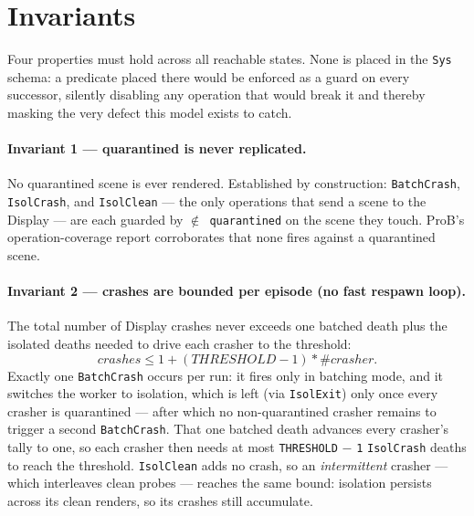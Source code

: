 \documentclass[a4paper,10pt,fleqn]{article}
\begin{document}
\section{Invariants}
\label{sec:inv}

Four properties must hold across all reachable states.  None is placed in the
\texttt{Sys} schema: a predicate placed there would be enforced as a guard on
every successor, silently disabling any operation that would break it and thereby
masking the very defect this model exists to catch.

\paragraph{Invariant 1 --- quarantined is never replicated.}
No quarantined scene is ever rendered.  Established by construction:
\texttt{BatchCrash}, \texttt{IsolCrash}, and \texttt{IsolClean} --- the only
operations that send a scene to the Display --- are each guarded by
\texttt{$\notin$ quarantined} on the scene they touch.  ProB's operation-coverage
report corroborates that none fires against a quarantined scene.

\paragraph{Invariant 2 --- crashes are bounded per episode (no fast respawn loop).}
The total number of Display crashes never exceeds one batched death plus the
isolated deaths needed to drive each crasher to the threshold:
\[
  crashes \leq 1 + (THRESHOLD - 1) * \# crasher.
\]
Exactly one \texttt{BatchCrash} occurs per run: it fires only in batching mode,
and it switches the worker to isolation, which is left (via \texttt{IsolExit})
only once every crasher is quarantined --- after which no non-quarantined crasher
remains to trigger a second \texttt{BatchCrash}.  That one batched death advances
every crasher's tally to one, so each crasher then needs at most
\texttt{THRESHOLD} $-$ \texttt{1} \texttt{IsolCrash} deaths to reach the
threshold.  \texttt{IsolClean} adds no crash, so an \emph{intermittent} crasher
--- which interleaves clean probes --- reaches the same bound: isolation persists
across its clean renders, so its crashes still accumulate.
\end{document}
